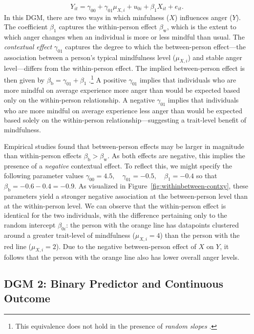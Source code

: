 \begin{equation}
    Y_{it} = \gamma_{00} + \gamma_{01} \mu_{X,i} + u_{0i} + \beta_1 X_{it} + e_{it}.
\end{equation}
In this DGM, there are two ways in which minfulness ($X$) influences anger ($Y$). The coefficient \( \beta_1 \) captures the within-person effect $\beta_\text{w}$, which is the extent to which anger changes when an individual is more or less mindful than usual. The \textit{contextual effect} \( \gamma_{01} \) captures the degree to which the between-person effect---the association between a person's typical mindfulness level (\( \mu_{X,i} \)) and stable anger level---differs from the within-person effect. The implied between-person effect is then given by $\beta_\text{b} = \gamma_{01} + \beta_1$ \parencite{mundlak_pooling_1978}.\footnote{This equivalence does not hold in the presence of \textit{random slopes} \parencite[cf.][]{snijders_multilevel_2011}.}  A positive \( \gamma_{01} \) implies that individuals who are more mindful on average experience more anger than would be expected based only on the within-person relationship. A negative \( \gamma_{01} \) implies that individuals who are more mindful on average experience less anger than would be expected based solely on the within-person relationship—suggesting a trait-level benefit of mindfulness. 

Empirical studies found that between-person effects may be larger in magnitude than within-person effects $\beta_\text{b} > \beta_\text{w}$. As both effects are negative, this implies the presence of a \textit{negative} contextual effect. To reflect this, we might specify the following parameter values $
\gamma_{00} = 4.5,\quad \gamma_{01} = -0.5,\quad \beta_1 = -0.4$ so that $\beta_\text{b} = -0.6 - 0.4 = -0.9$. As visualized in Figure~\ref{fig:withinbetween-contxy}, these parameters yield a stronger negative association at the between-person level than at the within-person level. We can observe that the within-person effect is identical for the two individuals, with the difference pertaining only to the random intercept $\beta_{0i}$: the person with the orange line has datapoints clustered around a greater trait-level of mindfulness ($\mu_{X,i} = 4$) than the person with the red line ($\mu_{X,i} = 2$). Due to the negative between-person effect of $X$ on $Y$, it follows that the person with the orange line also has lower overall anger levels.

\newpage


\subsection{DGM 2: Binary Predictor and Continuous Outcome}


